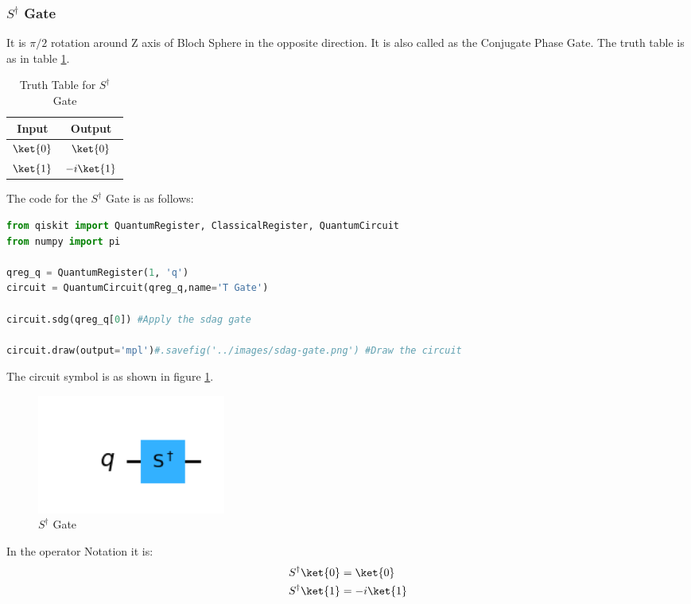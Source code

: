 \documentclass[12pt, oneside]{book}
\theoremstyle{definition}
\theoremstyle{definition}
\theoremstyle{remark}
\begin{document}
\subsubsection{$S^{\dagger}$ Gate}
It is $\pi/2$ rotation around Z axis of Bloch Sphere in the opposite direction.
It is also
called as the Conjugate Phase Gate. The truth table is as in table \ref{tab:s-dagger}.
\begin{table}[H]
    \centering
    \begin{tabular}{|c|c|}
        \hline
        Input & Output\\
        \hline
        $\ket{0}$ & $\ket{0}$\\
        $\ket{1}$ & $-i\ket{1}$\\
        \hline
    \end{tabular}
    \caption{Truth Table for $S^{\dagger}$ Gate}
    \label{tab:s-dagger}
\end{table}
The code for the $S^{\dagger}$ Gate is as follows:
\begin{lstlisting}[language=Python]
from qiskit import QuantumRegister, ClassicalRegister, QuantumCircuit
from numpy import pi

qreg_q = QuantumRegister(1, 'q')
circuit = QuantumCircuit(qreg_q,name='T Gate')

circuit.sdg(qreg_q[0]) #Apply the sdag gate

circuit.draw(output='mpl')#.savefig('../images/sdag-gate.png') #Draw the circuit
\end{lstlisting}

The circuit symbol is as shown in figure \ref{fig:s-dagger}.
\begin{figure}[H]
    \centering
    \includegraphics[width=0.3\textwidth]{../images/sdag-gate.png}
    \caption{$S^{\dagger}$ Gate}
    \label{fig:s-dagger}
\end{figure}
In the operator Notation it is:
\begin{align*}
    S^{\dagger}\ket{0}&=\ket{0} \\
    S^{\dagger}\ket{1}&=-i\ket{1}
\end{align*}
\end{document}
